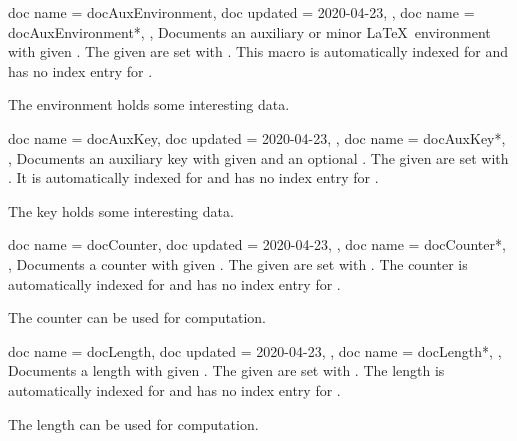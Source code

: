 \begin{docCommands}[doc parameter=\oarg{options}\marg{name}]
  {
    {
      doc name    = docAuxEnvironment,
      doc updated = 2020-04-23,
    },
    {
      doc name = docAuxEnvironment*,
    },
  }
  Documents an auxiliary or minor \LaTeX\ environment with given .
  The given  are set with .
  This macro is automatically indexed for 
  and has no index entry for .
\begin{dispExample}
The environment  holds some interesting data.
\end{dispExample}
\end{docCommands}


\begin{docCommands}[doc parameter=\oarg{key path}\oarg{options}\marg{name}]
  {
    {
      doc name    = docAuxKey,
      doc updated = 2020-04-23,
    },
    {
      doc name = docAuxKey*,
    },
  }
  Documents an auxiliary key with given  and an optional .
  The given  are set with .
  It is automatically indexed for 
  and has no index entry for .
\begin{dispExample}
The key  holds some interesting data.
\end{dispExample}
\end{docCommands}



\begin{docCommands}[doc parameter=\oarg{options}\marg{name}]
  {
    {
      doc name    = docCounter,
      doc updated = 2020-04-23,
    },
    {
      doc name = docCounter*,
    },
  }
  Documents a counter with given .
  The given  are set with .
  The counter is automatically indexed for 
  and has no index entry for .
\begin{dispExample}
The counter  can be used for computation.
\end{dispExample}
\end{docCommands}


\clearpage
\begin{docCommands}[doc parameter=\oarg{options}\marg{name}]
  {
    {
      doc name    = docLength,
      doc updated = 2020-04-23,
    },
    {
      doc name = docLength*,
    },
  }
  Documents a length with given .
  The given  are set with .
  The length is automatically indexed for 
  and has no index entry for .
\begin{dispExample}
The length  can be used for computation.
\end{dispExample}
\end{docCommands}


